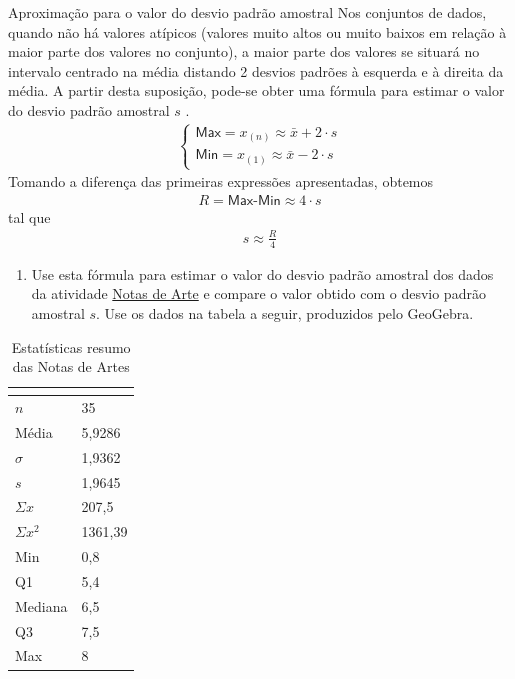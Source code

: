 {{{\begin{task}{Aproximação para o valor do desvio padrão amostral}
Nos conjuntos de dados, quando não há valores atípicos (valores muito altos ou muito baixos em relação à maior parte dos valores no conjunto), a maior parte dos valores se situará no intervalo centrado na média distando 2 desvios padrões à esquerda e à direita da média. A partir desta suposição, pode-se obter uma fórmula para estimar o valor do desvio padrão amostral \(s\) .
\begin{equation*}
\begin{split}\left \{ \begin{array}{l} \textsf{Max}=x_{(n)}\approx \bar{x}+2\cdot s \\ \textsf{Min}=x_{(1)}\approx \bar{x}-2\cdot s\end{array}\right.\end{split}
\end{equation*}
Tomando a diferença das primeiras expressões apresentadas, obtemos
\begin{equation*}
\begin{split}R= \textsf{Max-Min} \approx 4\cdot s\end{split}
\end{equation*}
tal que
\begin{equation*}
\begin{split}s\approx \frac{R}{4}\end{split}
\end{equation*}\begin{enumerate}
\item {} 
Use esta fórmula para estimar o valor do desvio padrão amostral dos dados da atividade \hyperref[\detokenize{PE104-0:ativ-notas-de-artes}]{Notas de Arte} e compare o valor obtido com o desvio padrão amostral \(s\). Use os dados na tabela a seguir, produzidos pelo GeoGebra.

\end{enumerate}

\begin{table}[H]
\centering
\begin{tabu} to \textwidth{|l|l|}
\hline
{}\\
\hline
$n$ & 35 \\
\hline
Média & 5,9286 \\
\hline
$\sigma$ & 1,9362 \\
\hline
$s$ & 1,9645 \\
\hline
$\Sigma x$ & 207,5 \\
\hline
$\Sigma x^2$ & 1361,39 \\
\hline
Min & 0,8 \\
\hline
Q1 & 5,4 \\
\hline
Mediana & 6,5 \\
\hline
Q3 & 7,5 \\
\hline
Max & 8 \\
\hline
\end{tabu}
\caption{Estatísticas resumo das Notas de Artes}\label{\detokenize{PE104-5:fig-resumonartes}}\label{\detokenize{PE104-5:id2}}
\end{table}


\end{task}}}}
